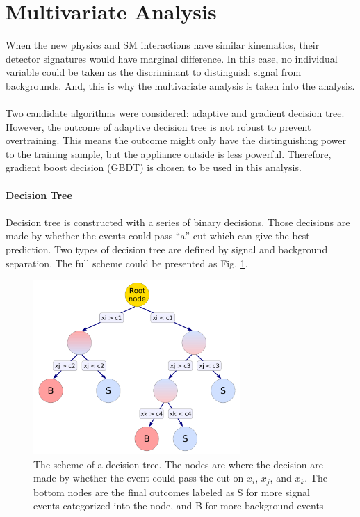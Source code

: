 \section{Multivariate Analysis}
When the new physics and SM interactions have similar kinematics, their detector signatures would have marginal difference. In this case, no individual variable could be taken as the discriminant to distinguish signal from backgrounds. And, this is why the multivariate analysis is taken into the analysis.
\\
\\Two candidate algorithms were considered: adaptive and gradient decision tree. However, the outcome of adaptive decision tree is not robust to prevent overtraining. This means the outcome might only have the distinguishing power to the training sample, but the appliance outside is less powerful. Therefore, gradient boost decision (GBDT) is chosen to be used in this analysis.
\\
\\{\bf Decision Tree}
\\
\\Decision tree is constructed with a series of binary decisions. Those decisions are made by whether the events could pass ``a'' cut which can give the best prediction. Two types of decision tree are defined by  signal and background separation. The full scheme could be presented as Fig. \ref{Fig:decision_tree}.
\begin{figure}[tbp]
	\begin{center}
		\includegraphics[width=0.7\textwidth,keepaspectratio]{Chapter5/DT.png}
		\caption{The scheme of a decision tree. The nodes are where the decision are made by whether the event could pass the cut on $x_i$, $x_j$, and $x_k$. The bottom nodes are the final outcomes labeled as S for more signal events categorized into the node, and B for more background events}
		\label{Fig:decision_tree}
	\end{center}
\end{figure} 
